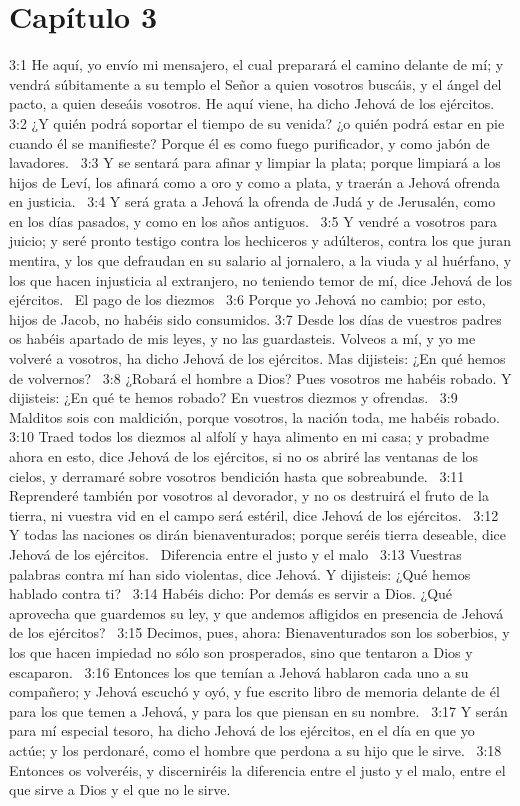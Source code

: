 \section*{Capítulo 3 }

3:1 He aquí, yo envío mi mensajero, el cual preparará el camino delante de mí; y vendrá súbitamente a su templo el Señor a quien vosotros buscáis, y el ángel del pacto, a quien deseáis vosotros. He aquí viene, ha dicho Jehová de los ejércitos.  
3:2 ¿Y quién podrá soportar el tiempo de su venida? ¿o quién podrá estar en pie cuando él se manifieste? Porque él es como fuego purificador, y como jabón de lavadores.  
3:3 Y se sentará para afinar y limpiar la plata; porque limpiará a los hijos de Leví, los afinará como a oro y como a plata, y traerán a Jehová ofrenda en justicia.  
3:4 Y será grata a Jehová la ofrenda de Judá y de Jerusalén, como en los días pasados, y como en los años antiguos.  
3:5 Y vendré a vosotros para juicio; y seré pronto testigo contra los hechiceros y adúlteros, contra los que juran mentira, y los que defraudan en su salario al jornalero, a la viuda y al huérfano, y los que hacen injusticia al extranjero, no teniendo temor de mí, dice Jehová de los ejércitos.  
El pago de los diezmos  
3:6 Porque yo Jehová no cambio; por esto, hijos de Jacob, no habéis sido consumidos. 
3:7 Desde los días de vuestros padres os habéis apartado de mis leyes, y no las guardasteis. Volveos a mí, y yo me volveré a vosotros, ha dicho Jehová de los ejércitos. Mas dijisteis: ¿En qué hemos de volvernos?  
3:8 ¿Robará el hombre a Dios? Pues vosotros me habéis robado. Y dijisteis: ¿En qué te hemos robado? En vuestros diezmos y ofrendas.  
3:9 Malditos sois con maldición, porque vosotros, la nación toda, me habéis robado.  
3:10 Traed todos los diezmos al alfolí y haya alimento en mi casa; y probadme ahora en esto, dice Jehová de los ejércitos, si no os abriré las ventanas de los cielos, y derramaré sobre vosotros bendición hasta que sobreabunde.  
3:11 Reprenderé también por vosotros al devorador, y no os destruirá el fruto de la tierra, ni vuestra vid en el campo será estéril, dice Jehová de los ejércitos.  
3:12 Y todas las naciones os dirán bienaventurados; porque seréis tierra deseable, dice Jehová de los ejércitos.  
Diferencia entre el justo y el malo  
3:13 Vuestras palabras contra mí han sido violentas, dice Jehová. Y dijisteis: ¿Qué hemos hablado contra ti?  
3:14 Habéis dicho: Por demás es servir a Dios. ¿Qué aprovecha que guardemos su ley, y que andemos afligidos en presencia de Jehová de los ejércitos?  
3:15 Decimos, pues, ahora: Bienaventurados son los soberbios, y los que hacen impiedad no sólo son prosperados, sino que tentaron a Dios y escaparon.  
3:16 Entonces los que temían a Jehová hablaron cada uno a su compañero; y Jehová escuchó y oyó, y fue escrito libro de memoria delante de él para los que temen a Jehová, y para los que piensan en su nombre.  
3:17 Y serán para mí especial tesoro, ha dicho Jehová de los ejércitos, en el día en que yo actúe; y los perdonaré, como el hombre que perdona a su hijo que le sirve.  
3:18 Entonces os volveréis, y discerniréis la diferencia entre el justo y el malo, entre el que sirve a Dios y el que no le sirve.  
